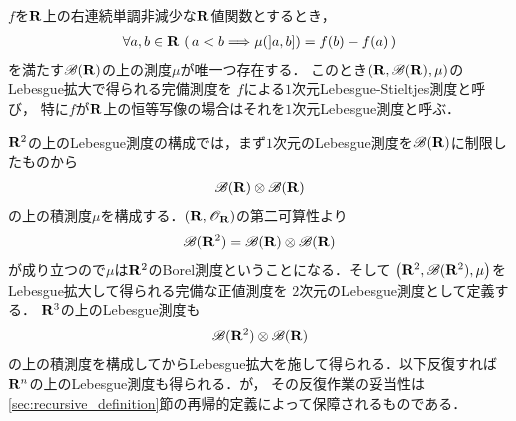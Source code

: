 	\begin{screen}
		\begin{dfn}
			$f$を$\mathbf{R}$上の右連続単調非減少な$\mathbf{R}$値関数とするとき，
			\begin{align}
				\forall a,b \in \mathbf{R}\, \left(\, a < b \Longrightarrow \mu(]a,b]) = f(b) - f(a)\, \right)
			\end{align}
			を満たす$\mathscr{B}(\mathbf{R})$の上の測度$\mu$が唯一つ存在する．
			このとき$(\mathbf{R},\mathscr{B}(\mathbf{R}),\mu)$のLebesgue拡大で得られる完備測度を
			$f$による$1$次元Lebesgue-Stieltjes測度と呼び，
			特に$f$が$\mathbf{R}$上の恒等写像の場合はそれを$1$次元Lebesgue測度と呼ぶ．
		\end{dfn}
	\end{screen}
	
	$\mathbf{R}^2$の上のLebesgue測度の構成では，まず$1$次元のLebesgue測度を$\mathscr{B}(\mathbf{R})$に制限したものから
	\begin{align}
		\mathscr{B}(\mathbf{R}) \otimes \mathscr{B}(\mathbf{R})
	\end{align}
	の上の積測度$\mu$を構成する．$(\mathbf{R},\mathscr{O}_{\mathbf{R}})$の第二可算性より
	\begin{align}
		\mathscr{B}(\mathbf{R}^2) = \mathscr{B}(\mathbf{R}) \otimes \mathscr{B}(\mathbf{R})
	\end{align}
	が成り立つので$\mu$は$\mathbf{R}^2$のBorel測度ということになる．そして
	$\left(\mathbf{R}^2,\mathscr{B}(\mathbf{R}^2),\mu\right)$をLebesgue拡大して得られる完備な正値測度を
	$2$次元のLebesgue測度として定義する．
	$\mathbf{R}^3$の上のLebesgue測度も
	\begin{align}
		\mathscr{B}(\mathbf{R}^2) \otimes \mathscr{B}(\mathbf{R})
	\end{align}
	の上の積測度を構成してからLebesgue拡大を施して得られる．以下反復すれば$\mathbf{R}^n$の上のLebesgue測度も得られる．が，
	その反復作業の妥当性は\ref{sec:recursive_definition}節の再帰的定義によって保障されるものである．
	
